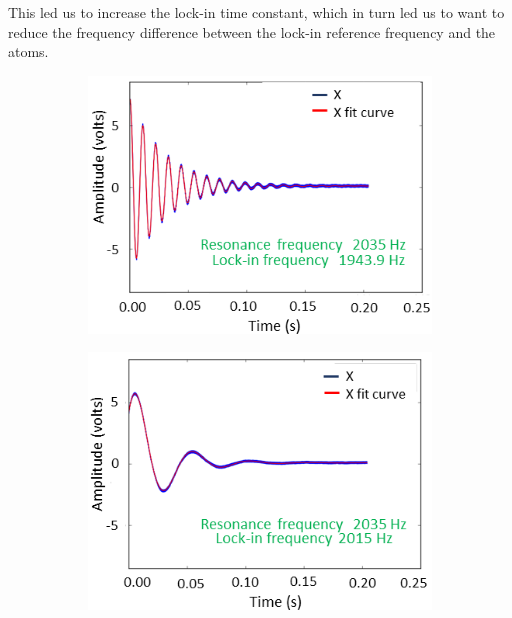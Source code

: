 This led us to increase the lock-in time constant, which in turn led
us to want to reduce the frequency difference between the lock-in
reference frequency and the atoms.

\begin{figure}
  \centering
  \begin{subfigure}[b]{0.47\textwidth}
    \centering
    \includegraphics[width=\textwidth]{figures/reference_frequency1}
    \caption{}
    \label{fig:far from resonance}
  \end{subfigure}
  \hfill
  \begin{subfigure}[b]{0.47\textwidth}
    \centering
    \includegraphics[width=\textwidth]{figures/reference_frequency3}

\end{subfigure}
\end{figure}
